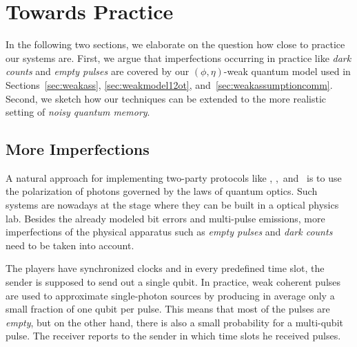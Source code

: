 

\section{Towards Practice} \label{sec:techpractice}
In the following two sections, we elaborate on the question how close
to practice our systems are. First, we argue that imperfections
occurring in practice like \emph{dark counts} and \emph{empty pulses}
are covered by our $(\phi,\eta)$-weak quantum model used in
Sections~\ref{sec:weakass}, \ref{sec:weakmodel12ot}, and~\ref{sec:weakassumptioncomm}. Second,
we sketch how our techniques can be extended to the more realistic
setting of \emph{noisy quantum memory}.

\subsection{More Imperfections} \label{sec:moreimperfect}
A natural approach for implementing two-party protocols like \BBqot,
\Randlqot,\ and \comm\ is to use the polarization of photons governed
by the laws of quantum optics. Such systems are nowadays at the stage
where they can be built in a optical physics lab.  Besides the
already modeled bit errors and multi-pulse emissions, more
imperfections of the physical apparatus such as \emph{empty pulses}
and \emph{dark counts} need to be taken into account.
  

The players have synchronized clocks and in every predefined time
 slot, the sender is supposed to send out a single qubit. In practice,
 
weak coherent pulses are used to approximate single-photon sources by
producing in average only a small fraction of one qubit per pulse.
This means that most of the pulses are \emph{empty}, but on the other
hand, there is also a small probability for a multi-qubit pulse. The
receiver reports to the sender in which 
time slots he received pulses.

